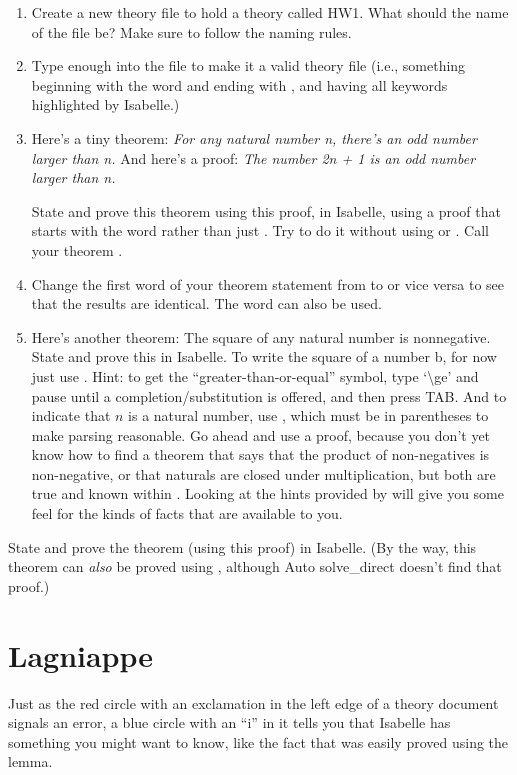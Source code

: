 \begin{enumerate}
    \item Create a new theory file to hold a theory called HW1. What should the name of the file be? Make sure to follow the naming rules.
    \item Type enough into the file to make it a valid theory file (i.e., something beginning with the word  and ending with , and having all keywords highlighted by Isabelle.)
    \item Here's a tiny theorem: \textit{For any natural number n, there's an odd number larger than n. }And here's a proof:\textit{ The number 2n + 1 is an odd number larger than n. }

State and prove this theorem using this proof, in Isabelle, using a proof that starts with the word  rather than just . Try to do it without using  or . Call your theorem . 

\item Change the first word of your theorem statement from  to  or vice versa to see that the results are identical. The word  can also be used. 
 
\item Here's another theorem: The square of any natural number is nonnegative. State and prove this in Isabelle. To write the square of a number b, for now just use . Hint: to get the ``greater-than-or-equal'' symbol, type `\textbackslash{}ge' and pause until a completion/substitution is offered, and then press TAB. And to indicate that $n$ is a natural number, use , which must be in parentheses to make parsing reasonable. Go ahead and use a  proof, because you don't yet know how to find a theorem that says that the product of non-negatives is non-negative, or that naturals are closed under multiplication, but both are true and known within . Looking at the hints provided by  will give you some feel for the kinds of facts that are available to you. 

\end{enumerate}
State and prove the theorem (using this proof) in Isabelle. (By the way, this theorem can \textit{also }be proved using , although Auto solve\_direct doesn't find that proof.)

\section{Lagniappe}

Just as the red circle with an exclamation in the left edge of a theory document signals an error, a blue circle with an ``i'' in it tells you that Isabelle has something you might want to know, like the fact that  was easily proved using the  lemma. 

 
